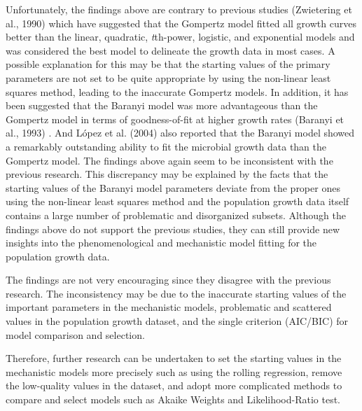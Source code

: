 \documentclass[11pt, a4paper]{article}
\begin{document}
Unfortunately, the findings above are contrary to previous studies (Zwietering et al., 1990) \cite{zwietering1990modeling} which have suggested that the Gompertz model fitted all growth curves better than the linear, quadratic, \textit{t}th-power, logistic, and exponential models and was considered the best model to delineate the growth data in most cases. A possible explanation for this may be that the starting values of the primary parameters are not set to be quite appropriate by using the non-linear least squares method, leading to the inaccurate Gompertz models. In addition, it has been suggested that the Baranyi model was more advantageous than the Gompertz model in terms of goodness-of-fit at higher growth rates (Baranyi et al., 1993) \cite{baranyi1993non}. And López et al. (2004) \cite{lopez2004statistical} also reported that the Baranyi model showed a remarkably outstanding ability to fit the microbial growth data than the Gompertz model. The findings above again seem to be inconsistent with the previous research. This discrepancy may be explained by the facts that the starting values of the Baranyi model parameters deviate from the proper ones using the non-linear least squares method and the population growth data itself contains a large number of problematic and disorganized subsets. Although the findings above do not support the previous studies, they can still provide new insights into the phenomenological and mechanistic model fitting for the population growth data. 

The findings are not very encouraging since they disagree with the previous research. The inconsistency may be due to the inaccurate starting values of the important parameters in the mechanistic models, problematic and scattered values in the population growth dataset, and the single criterion (AIC/BIC) for model comparison and selection.  

Therefore, further research can be undertaken to set the starting values in the mechanistic models more precisely such as using the rolling regression, remove the low-quality values in the dataset, and adopt more complicated methods to compare and select models such as Akaike Weights and Likelihood-Ratio test. 
\end{document}
